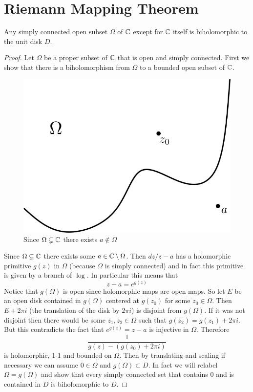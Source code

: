 \section{Riemann Mapping Theorem}
\begin{theorem}
    Any simply connected open subset $\Omega$ of $\mathbb{C}$ except for $\mathbb{C}$ itself is biholomorphic to the unit disk $D$.
\end{theorem}
\begin{proof}
    Let $\Omega$ be a proper subset of $\mathbb{C}$ that is open and simply connected. First we show that there is a biholomorphism from $\Omega$ to a bounded open subset of $\mathbb{C}$.

    \begin{figure}[ht]
        \centering
        \includegraphics[scale=0.7]{Images/riem_map_pf_1.png}
        \caption{Since $\Omega \subsetneq \mathbb{C}$ there exists $a \notin \Omega$}
        \label{fig:riem-map-pf-1}
    \end{figure}
    
    Since $\Omega \subsetneq \mathbb{C}$ there exists some $a \in \mathbb{C} \setminus \Omega$. Then $dz/z - a$ has a holomorphic primitive $g(z)$ in $\Omega$ (because $\Omega$ is simply connected) and in fact this primitive is given by a branch of $\log$. In particular this means that 
    $$z - a = e^{g(z)}$$
    Notice that $g(\Omega)$ is open since holomorphic maps are open maps. So let $E$ be an open disk contained in $g(\Omega)$ centered at $g(z_0)$ for some $z_0 \in \Omega$. Then $E + 2\pi i$ (the translation of the disk by $2\pi i$) is disjoint from $g(\Omega)$. If it was not disjoint then there would be some $z_1, z_2 \in \Omega$ such that $g(z_2) = g(z_1) + 2\pi i$. But this contradicts the fact that $e^{g(z)} = z - a$ is injective in $\Omega$. Therefore
    $$\frac{1}{g(z) - (g(z_0) + 2\pi i)}$$
    is holomorphic, 1-1 and bounded on $\Omega$. Then by translating and scaling if necessary we can assume $0 \in \Omega$ and $g(\Omega) \subset D$. In fact we will relabel $\Omega = g(\Omega)$ and show that every simply connected set that contains 0 and is contained in $D$ is biholomorphic to $D$.


\end{proof}
